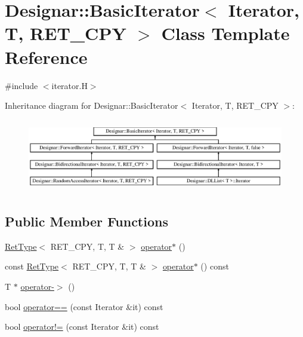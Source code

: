 \hypertarget{class_designar_1_1_basic_iterator}{}\section{Designar\+:\+:Basic\+Iterator$<$ Iterator, T, R\+E\+T\+\_\+\+C\+PY $>$ Class Template Reference}
\label{class_designar_1_1_basic_iterator}


{\ttfamily \#include $<$iterator.\+H$>$}

Inheritance diagram for Designar\+:\+:Basic\+Iterator$<$ Iterator, T, R\+E\+T\+\_\+\+C\+PY $>$\+:\begin{figure}[H]
\begin{center}
\leavevmode
\includegraphics[height=3.209169cm]{class_designar_1_1_basic_iterator}
\end{center}
\end{figure}
\subsection*{Public Member Functions}
\begin{DoxyCompactItemize}
\item 
\hyperlink{namespace_designar_ab937f9c4bf5f1d0e65dbc616245d50ee}{Ret\+Type}$<$ R\+E\+T\+\_\+\+C\+PY, T, T \& $>$ \hyperlink{class_designar_1_1_basic_iterator_aed614b1aca7f9cb1552699b106bb281f}{operator$\ast$} ()
\item 
const \hyperlink{namespace_designar_ab937f9c4bf5f1d0e65dbc616245d50ee}{Ret\+Type}$<$ R\+E\+T\+\_\+\+C\+PY, T, T \& $>$ \hyperlink{class_designar_1_1_basic_iterator_aa016cf79d8fd6b3e9f73c3dbbbaf7a31}{operator$\ast$} () const
\item 
T $\ast$ \hyperlink{class_designar_1_1_basic_iterator_ac87226512fbbe7c524cc0be8ae2ee914}{operator-\/$>$} ()
\item 
bool \hyperlink{class_designar_1_1_basic_iterator_abaca601c4d1d4ff27429426437abbf02}{operator==} (const Iterator \&it) const
\item 
bool \hyperlink{class_designar_1_1_basic_iterator_aea51bca6ffed62c081aefbcb804a21f1}{operator!=} (const Iterator \&it) const
\end{DoxyCompactItemize}
